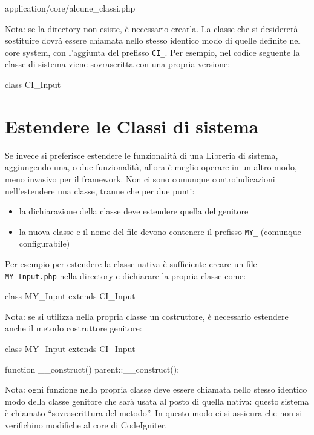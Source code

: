\begin{code}
application/core/alcune_classi.php
\end{code}

Nota: se la directory non esiste, è necessario crearla. La classe che si desidererà sostituire dovrà essere chiamata nello stesso identico modo di quelle definite nel core system, con l'aggiunta del prefisso \verb|CI_|. Per esempio, nel codice seguente la classe di sistema  viene sovrascritta con una propria versione:

\begin{code}
class CI_Input {

}
\end{code}

\section*{Estendere le Classi di sistema}
Se invece si preferisce estendere le funzionalità di una Libreria di sistema, aggiungendo una, o due funzionalità, allora è meglio operare in un altro modo, meno invasivo per il framework. Non ci sono comunque controindicazioni nell'estendere una classe, tranne che per due punti:

\begin{itemize}
\item la dichiarazione della classe deve estendere quella del genitore
\item la nuova classe e il nome del file devono contenere il prefisso \verb|MY_| (comunque configurabile)
\end{itemize}

Per esempio per estendere la classe nativa  è sufficiente creare un file \verb|MY_Input.php| nella directory  e dichiarare la propria classe come:

\begin{code}
class MY_Input extends CI_Input {

}
\end{code}

Nota: se si utilizza nella propria classe un costruttore, è necessario estendere anche il metodo costruttore genitore:

\begin{code}
class MY_Input extends CI_Input {

	function __construct() {
		parent::__construct();
    }
}
\end{code}

Nota: ogni funzione nella propria classe deve essere chiamata nello stesso identico modo della classe genitore che sarà usata al posto di quella nativa: questo sistema è chiamato ``sovrascrittura del metodo''. In questo modo ci si assicura che non si verifichino modifiche al core di CodeIgniter.


